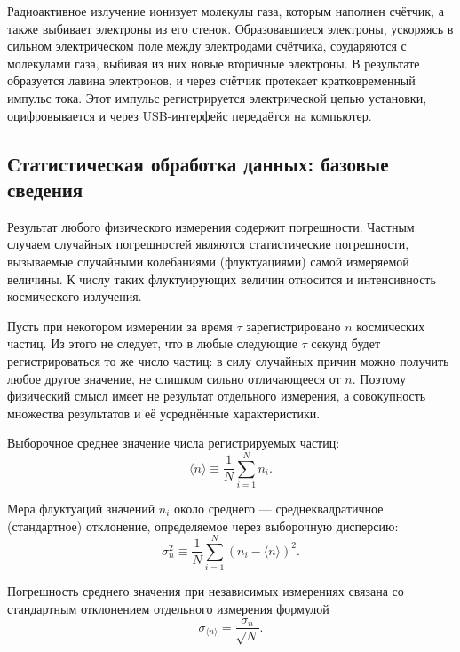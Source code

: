 \documentclass[12pt,a4paper]{article}
\begin{document}
Радиоактивное излучение ионизует молекулы газа, которым наполнен счётчик, а также выбивает электроны из его стенок. Образовавшиеся электроны, ускоряясь в сильном электрическом поле между электродами счётчика, соударяются с молекулами газа, выбивая из них новые вторичные электроны. В результате образуется лавина электронов, и через счётчик протекает кратковременный импульс тока. Этот импульс регистрируется электрической цепью установки, оцифровывается и через USB-интерфейс передаётся на компьютер.

\subsection*{Статистическая обработка данных: базовые сведения}

Результат любого физического измерения содержит погрешности. Частным случаем случайных погрешностей являются статистические погрешности, вызываемые случайными колебаниями (флуктуациями) самой измеряемой величины. К числу таких флуктуирующих величин относится и интенсивность космического излучения.

Пусть при некотором измерении за время $\tau$ зарегистрировано $n$ космических частиц. Из этого не следует, что в любые следующие $\tau$ секунд будет регистрироваться то же число частиц: в силу случайных причин можно получить любое другое значение, не слишком сильно отличающееся от $n$. Поэтому физический смысл имеет не результат отдельного измерения, а совокупность множества результатов и её усреднённые характеристики.

Выборочное среднее значение числа регистрируемых частиц:
\begin{equation}
    \langle n\rangle \equiv \frac{1}{N}\sum_{i=1}^{N} n_i.
    \label{eq:mean}
\end{equation}

Мера флуктуаций значений $n_i$ около среднего — среднеквадратичное (стандартное) отклонение, определяемое через выборочную дисперсию:
\begin{equation}
    \sigma_n^2 \equiv \frac{1}{N}\sum_{i=1}^{N}(n_i - \langle n\rangle)^2.
    \label{eq:variance}
\end{equation}

Погрешность среднего значения при независимых измерениях связана со стандартным отклонением отдельного измерения формулой
\begin{equation}
    \sigma_{\langle n\rangle} = \frac{\sigma_n}{\sqrt{N}}.
    \label{eq:mean_error}
\end{equation}
\end{document}
